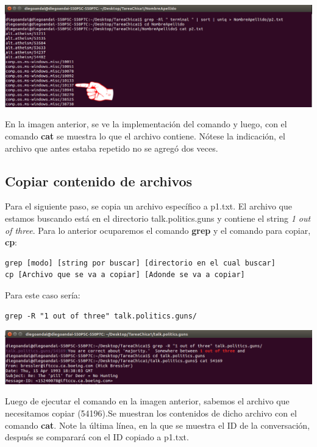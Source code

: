 \documentclass[a4paper,11pt]{article}
\theoremstyle{mytheor}
\begin{document}
\begin{center}
\includegraphics[scale=0.385]{tc1_11.png}
\end{center}

En la imagen anterior, se ve la implementación del comando y luego, con el comando \textbf{cat} se muestra lo que el archivo contiene. Nótese la indicación, el archivo que antes estaba repetido no se agregó dos veces.

\subsection{Copiar contenido de archivos}

Para el siguiente paso, se copia un archivo específico a p1.txt. El archivo que estamos buscando está en el directorio talk.politics.guns y contiene el string \textit{1 out of three}. Para lo anterior ocuparemos el comando \textbf{grep} y el comando para copiar, \textbf{cp}:

\begin{lstlisting}
grep [modo] [string por buscar] [directorio en el cual buscar]
cp [Archivo que se va a copiar] [Adonde se va a copiar]
\end{lstlisting}

Para este caso sería:

\begin{lstlisting}
grep -R "1 out of three" talk.politics.guns/
\end{lstlisting}

\begin{center}
\includegraphics[scale=0.4]{tc1_paso8.png}
\end{center}

Luego de ejecutar el comando en la imagen anterior, sabemos el archivo que necesitamos copiar (54196).Se muestran los contenidos de dicho archivo con el comando \textbf{cat}. Note la última línea, en la que se muestra el ID de la conversación, después se comparará con el ID copiado a p1.txt.
\end{document}

